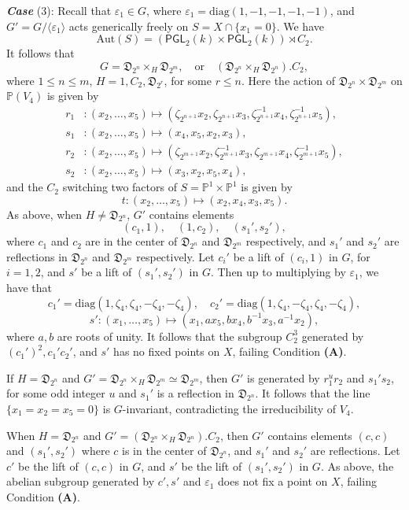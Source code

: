 \documentclass[12pt,reqno]{amsart}
\theoremstyle{plain}
\theoremstyle{remark}
\theoremstyle{definition}
\numberwithin{equation}{section}
\def\fD{{\mathfrak D}}
\def\bP{{\mathbb P}}
\def\Aut{\mathrm{Aut}}
\def\PGL{\mathsf{PGL}}
\begin{document}
{\bf\em Case }(3): Recall that $\varepsilon_1\in G$, where $\varepsilon_1= \mathrm{diag}(1,-1,-1,-1,-1)$, and $G'=G/\langle\varepsilon_1\rangle$ acts generically freely on $S=X\cap\{x_1=0\}$. We have 
$$
\Aut(S)=(\PGL_2(k)\times\PGL_2(k))\rtimes C_2.
$$
It follows that 
$$
G=\fD_{2^n}\times_H\fD_{2^m},\quad \text{or}\quad (\fD_{2^n}\times_H\fD_{2^n}).C_2,
$$
where $1\leq n\leq m$, $H=1,C_2, \fD_{2^r}$, for some $r\leq n$. Here the action of $\fD_{2^n}\times\fD_{2^m}$ on $\bP(V_4)$ is given by 
\begin{align*}
    r_1&:(x_2,\ldots,x_5)\mapsto(\zeta_{2^{n+1}}x_2,\zeta_{2^{n+1}}x_3,\zeta_{2^{n+1}}^{-1}x_4,\zeta_{2^{n+1}}^{-1}x_5),\\
    s_1&:(x_2,\ldots,x_5)\mapsto(x_4,x_5,x_2,x_3),\\
    r_2&:(x_2,\ldots,x_5)\mapsto(\zeta_{2^{m+1}}x_2,\zeta^{-1}_{2^{m+1}}x_3,\zeta_{2^{m+1}}x_4,\zeta_{2^{m+1}}^{-1}x_5),\\
    s_2&:(x_2,\ldots,x_5)\mapsto(x_3,x_2,x_5,x_4),
\end{align*}
and the $C_2$ switching  two factors of $S=\bP^1\times \bP^1$ is given by 
  $$ 
  t:(x_2,\ldots,x_5)\mapsto(x_2,x_4,x_3,x_5).
  $$
As above, when $H\ne \fD_{2^n}$, $G'$ contains elements
$$
(c_1,1),\quad (1,c_2), \quad (s_1',s_2'),
$$
where $c_1$ and $c_2$ are in the center of $\fD_{2^n}$ and $\fD_{2^m}$ respectively, and $s_1'$ and $s_2'$ are reflections in $\fD_{2^n}$ and $\fD_{2^m}$ respectively. Let $c_i'$ be a lift of $(c_i,1)$ in $G$, for $i=1,2$, and $s'$ be a lift of $(s_1',s_2')$ in $G$. Then up to multiplying by $\varepsilon_1$, we have that 
$$
    c_1'=\mathrm{diag}(1,\zeta_4,\zeta_4,-\zeta_4,-\zeta_4),\quad   c_2'=\mathrm{diag}(1,\zeta_4,-\zeta_4,\zeta_4,-\zeta_4),
$$
$$
s':(x_1,\ldots,x_5)\mapsto (x_1,ax_5,bx_4,b^{-1}x_3,a^{-1}x_2),
$$
where $a,b$ are roots of unity. It follows that the subgroup $C_2^3$ generated by 
$
(c_1')^2, c_1'c_2'$, and $s'$
has no fixed points on $X$, failing Condition {\bf (A)}.

If $H=\fD_{2^n}$ and $G'=\fD_{2^n}\times_H\fD_{2^m}\simeq \fD_{2^m}$,  then $G'$ is generated by $r_1^ur_2$ and $s_1's_2$, for some odd integer $u$ and $s_1'$ is a reflection in $\fD_{2^n}$. It follows that the line $\{x_1=x_2=x_5=0\}$ is $G$-invariant, contradicting the irreducibility of $V_4$. 

When $H=\fD_{2^n}$ and $G'=(\fD_{2^n}\times_H\fD_{2^n}).C_2$, then $G'$ contains elements $(c,c)$ and $(s_1',s_2')$ where $c$ is in the center of $\fD_{2^n}$, and $s_1'$ and $s_2'$ are reflections. Let $c'$ be the lift of $(c,c)$ in $G$, and $s'$ be the lift of $(s_1',s_2')$ in $G$. As above, the abelian subgroup generated by $c', s'$ and $\varepsilon_1$ does not fix a point on $X$, failing Condition {\bf (A)}.
\end{document}

